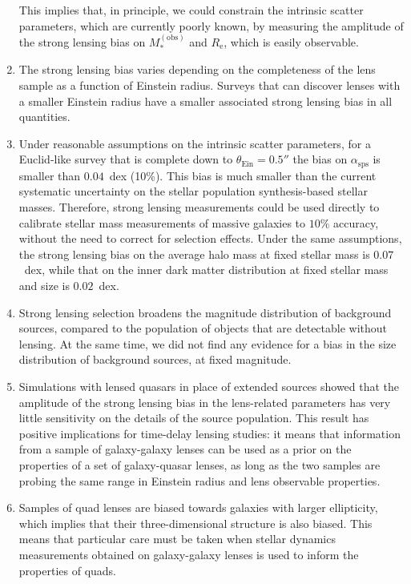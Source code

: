 \documentclass{aa}
\def\reff{R_{\mathrm{e}}}
\def\asps{\alpha_{\mathrm{sps}}}
\def\mobs{M_*^{(\mathrm{obs})}}
\def\tein{\theta_{\mathrm{Ein}}}
\begin{document}
\begin{enumerate}
This implies that, in principle, we could constrain the intrinsic scatter parameters, which are currently poorly known, by measuring the amplitude of the strong lensing bias on $\mobs$ and $\reff$, which is easily observable.
\item The strong lensing bias varies depending on the completeness of the lens sample as a function of Einstein radius. Surveys that can discover lenses with a smaller Einstein radius have a smaller associated strong lensing bias in all quantities.
\item 
Under reasonable assumptions on the intrinsic scatter parameters, for a Euclid-like survey that is complete down to $\tein=0.5''$ the bias on $\asps$ is smaller than $0.04$~dex (10\%). This bias is much smaller than the current systematic uncertainty on the stellar population synthesis-based stellar masses. Therefore, strong lensing measurements could be used directly to calibrate stellar mass measurements of massive galaxies to $10\%$ accuracy, without the need to correct for selection effects.
Under the same assumptions, the strong lensing bias on the average halo mass at fixed stellar mass is $0.07$~dex, while that on the inner dark matter distribution at fixed stellar mass and size is $0.02$~dex.
%
\item Strong lensing selection broadens the magnitude distribution of background sources, compared to the population of objects that are detectable without lensing.
At the same time, we did not find any evidence for a bias in the size distribution of background sources, at fixed magnitude.

\item Simulations with lensed quasars in place of extended sources showed that the amplitude of the strong lensing bias in the lens-related parameters has very little sensitivity on the details of the source population.
This result has positive implications for time-delay lensing studies: it means that information from a sample of galaxy-galaxy lenses can be used as a prior on the properties of a set of galaxy-quasar lenses, as long as the two samples are probing the same range in Einstein radius and lens observable properties.
\item Samples of quad lenses are biased towards galaxies with larger ellipticity, which implies that their three-dimensional structure is also biased. This means that particular care must be taken when stellar dynamics measurements obtained on galaxy-galaxy lenses is used to inform the properties of quads.
\end{enumerate}
\end{document}
